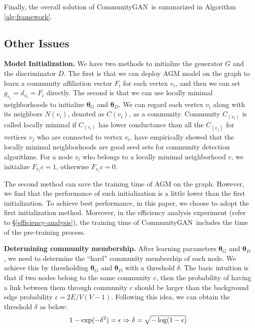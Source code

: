\documentclass[sigconf]{acmart}
\newcommand{\ComGAN}{CommunityGAN}
\begin{document}
Finally, the overall solution of \ComGAN~is summarized in Algorithm \ref{alg:framework}.


\subsection{Other Issues}

\vspace{5pt}\noindent\textbf{Model Initialization.}
We have two methods to initialize the generator $G$ and the discriminator $D$.
The first is that we can deploy AGM model on the graph to learn a community affiliation vector $F_i$ for each vertex $v_i$, and then we can set $g_{v_i}=d_{v_i}=F_i$ directly.
The second is that we can use locally minimal neighborhoods \cite{Neighborhoods-2012} to initialize $\mathbf{\theta}_G$ and $\mathbf{\theta}_D$.
We can regard each vertex $v_i$ along with its neighbors $N(v_i)$, denoted as $C(v_i)$, as a community.
Community $C_(v_i)$ is called locally minimal if $C_(v_i)$ has lower conductance than all the $C_(v_j)$ for vertices $v_j$ who are connected to vertex $v_i$.
\citet{Neighborhoods-2012} have empirically showed that the locally minimal neighborhoods are good seed sets for community detection algorithms.
For a node $v_i$ who belongs to a locally minimal neighborhood $c$, we initialize $F_{v_i}c = 1$, otherwise $F_{v_i}c = 0$.

The second method can save the training time of AGM on the graph.
However, we find that the performance of such initialization is a little lower than the first initialization.
To achieve best performance, in this paper, we choose to adopt the first initialization method.
Moreover, in the efficiency analysis experiment (refer to \S \ref{efficiency-analysis}), the training time of \ComGAN~includes the time of the pre-training process.

\vspace{5pt}\noindent\textbf{Determining community membership.} 
After learning parameters $\mathbf{\theta}_G$ and $\mathbf{\theta}_D$, we need to determine the ``hard'' community membership of each node.
We achieve this by thresholding $\mathbf{\theta}_G$ and $\mathbf{\theta}_D$ with a threshold $\delta$.
The basic intuition is that if two nodes belong to the same community $c$, then the probability of having a link between them through community $c$ should be larger than the background edge probability $\epsilon = 2E/V(V-1)$.
Following this idea, we can obtain the threshold $\delta$ as below:
\begin{equation}
\label{threshold}
\small
  1 - \exp(-\delta^2) = \epsilon \Rightarrow \delta = \sqrt{-\log(1-\epsilon)}
\end{equation} 
\end{document}
